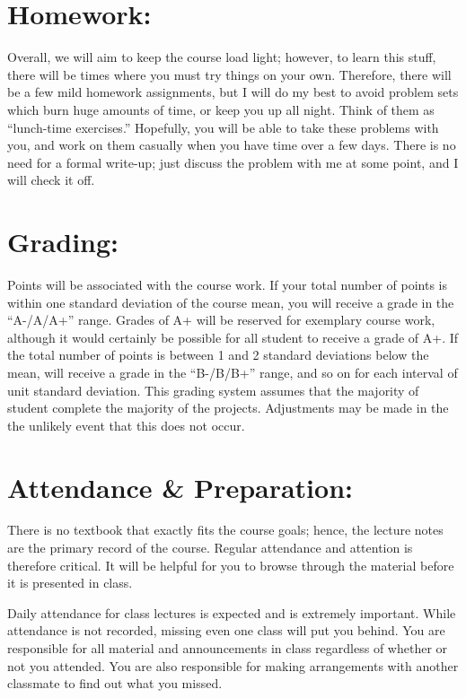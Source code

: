 \documentclass[margin]{res}
\theoremstyle{plain}
\theoremstyle{definition}
\theoremstyle{remark}
\begin{document}
\begin{resume}
\section{Homework:}
Overall, we will aim to keep the course load light; however, to learn this stuff, there will be times where you must try things on your own.  Therefore, there will be a few mild homework assignments, but I will do my best to avoid problem sets which burn huge amounts of time, or keep you up all night.  Think of them as ``lunch-time exercises.''  Hopefully, you will be able to take these problems with you, and work on them casually when you have time over a few days.  There is no need for a formal write-up; just discuss the problem with me at some point, and I will check it off.


\section{Grading:} 
Points will be associated with the course work.  If your total number of points is within one standard deviation of the course mean, you will receive a grade in the ``A-/A/A+'' range.  Grades of A+ will be reserved for exemplary course work, although it would certainly be possible for all student to receive a grade of A+.  If the total number of points is between 1 and 2 standard deviations below the mean, will receive a grade in the ``B-/B/B+'' range, and so on for each interval of unit standard deviation.  This grading system assumes that the majority of student complete the majority of the projects.  Adjustments may be made in the the unlikely event that this does not occur.

\section{Attendance \& Preparation:} 
There is no textbook that exactly fits the course goals; hence, the lecture notes are the primary record of the course. Regular attendance and attention is therefore critical. It will be helpful for you to browse through the material before it is presented in class.

Daily attendance for class lectures is expected and is extremely important. 
While attendance is not recorded, missing even one class will put you behind.    You are responsible for all material and announcements in class regardless of whether or not you attended.  You are also responsible for making arrangements with another classmate to find out what you missed. 


\end{resume}
\end{document}
